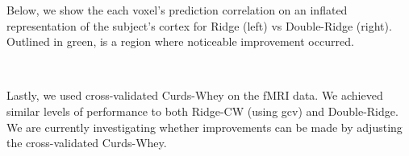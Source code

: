 \documentclass{article}
\begin{document}
    Below, we show the each voxel's prediction correlation on an inflated
representation of the subject's cortex for Ridge (left) vs Double-Ridge
(right). Outlined in green, is a region where noticeable improvement
occurred.


    \begin{center}
    \end{center}
    { \hspace*{\fill} \\}


Lastly, we used cross-validated Curds-Whey on the fMRI data. We achieved similar levels of performance to both Ridge-CW (using gcv) and Double-Ridge. We are currently investigating whether improvements can be made by adjusting the cross-validated Curds-Whey.     
    
    
    
\end{document}
